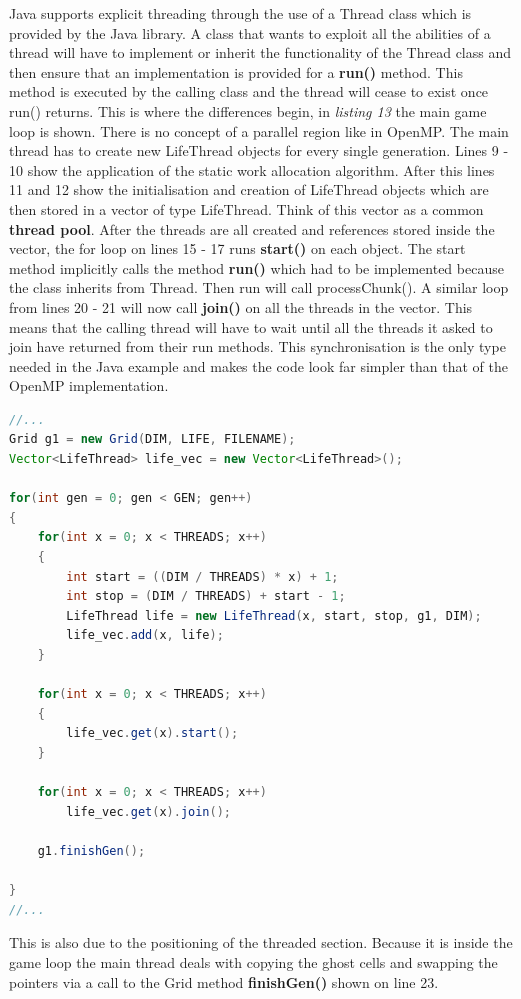 \documentclass[11pt]{article} %
\begin{document}
Java supports explicit threading through the use of a Thread class which is provided by the Java library. A class that wants to exploit all the abilities of a thread will have to implement or inherit the functionality of the Thread class and then ensure that an implementation is provided for a {\bf run()}  method. This method is executed by the calling class and the thread will cease to exist once run() returns. This is where the differences begin, in {\it listing 13} the main game loop is shown. There is no concept of a parallel region like in OpenMP. The main thread has to create new LifeThread objects for every single generation. Lines 9 - 10 show the application of the static work allocation algorithm. After this lines 11 and 12 show the initialisation and creation of LifeThread objects which are then stored in a vector of type LifeThread. Think of this vector as a common {\bf thread pool}. After the threads are all created and references stored inside the vector, the for loop on lines 15 - 17 runs {\bf start()} on each object. The start method implicitly calls the method {\bf run()} which had to be implemented because the class inherits from Thread. Then run will call processChunk(). A similar loop from lines 20 - 21 will now call {\bf join()} on all the threads in the vector. This means that the calling thread will have to wait until all the threads it asked to join have returned from their run methods. This synchronisation is the only type needed in the Java example and makes the code look far simpler than that of the OpenMP implementation. 
\begin{lstlisting}[language=Java, caption={Class GoL main game loop in GoL.java}]
//...
Grid g1 = new Grid(DIM, LIFE, FILENAME);
Vector<LifeThread> life_vec = new Vector<LifeThread>();

for(int gen = 0; gen < GEN; gen++)
{
    for(int x = 0; x < THREADS; x++)
    {
        int start = ((DIM / THREADS) * x) + 1;
        int stop = (DIM / THREADS) + start - 1;
        LifeThread life = new LifeThread(x, start, stop, g1, DIM);
        life_vec.add(x, life);
    }

    for(int x = 0; x < THREADS; x++)
    {
        life_vec.get(x).start();
    }   

    for(int x = 0; x < THREADS; x++)
        life_vec.get(x).join();
    
    g1.finishGen();
  
}
//...
\end{lstlisting}
This is also due to the positioning of the threaded section. Because it is inside the game loop the main thread deals with copying the ghost cells and swapping the pointers via a call to the Grid method {\bf finishGen()} shown on line 23.
\end{document}
